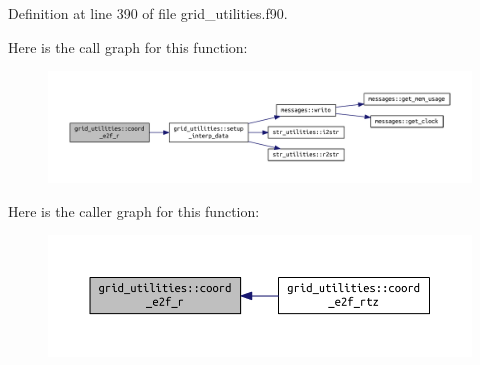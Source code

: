 Definition at line 390 of file grid\+\_\+utilities.\+f90.

Here is the call graph for this function\+:
\nopagebreak
\begin{figure}[H]
\begin{center}
\leavevmode
\includegraphics[width=350pt]{namespacegrid__utilities_a7866b2c198255dec7904dac73ccf4340_cgraph}
\end{center}
\end{figure}
Here is the caller graph for this function\+:
\nopagebreak
\begin{figure}[H]
\begin{center}
\leavevmode
\includegraphics[width=350pt]{namespacegrid__utilities_a7866b2c198255dec7904dac73ccf4340_icgraph}
\end{center}
\end{figure}
\mbox{\label{namespacegrid__utilities_a2a3c0509679b438d9d5aa5bedfb7a7b8}} 
